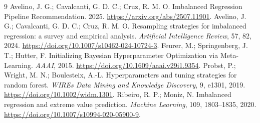 \documentclass[10pt,a4paper]{article}
\begin{document}
\begin{thebibliography}{9}
\small
{} Avelino, J. G.; Cavalcanti, G. D. C.; Cruz, R. M. O. Imbalanced Regression Pipeline Recommendation. 2025. \url{https://arxiv.org/abs/2507.11901}.
 Avelino, J. G.; Cavalcanti, G. D. C.; Cruz, R. M. O. Resampling strategies for imbalanced regression: a survey and empirical analysis. \textit{Artificial Intelligence Review}, 57, 82, 2024. \url{https://doi.org/10.1007/s10462-024-10724-3}.
 Feurer, M.; Springenberg, J. T.; Hutter, F. Initializing Bayesian Hyperparameter Optimization via Meta-Learning. \textit{AAAI}, 2015. \url{https://doi.org/10.1609/aaai.v29i1.9354}.
 Probst, P.; Wright, M. N.; Boulesteix, A.-L. Hyperparameters and tuning strategies for random forest. \textit{WIREs Data Mining and Knowledge Discovery}, 9, e1301, 2019. \url{https://doi.org/10.1002/widm.1301}.
 Ribeiro, R. P.; Moniz, N. Imbalanced regression and extreme value prediction. \textit{Machine Learning}, 109, 1803--1835, 2020. \url{https://doi.org/10.1007/s10994-020-05900-9}.
\end{thebibliography}
\end{document}
